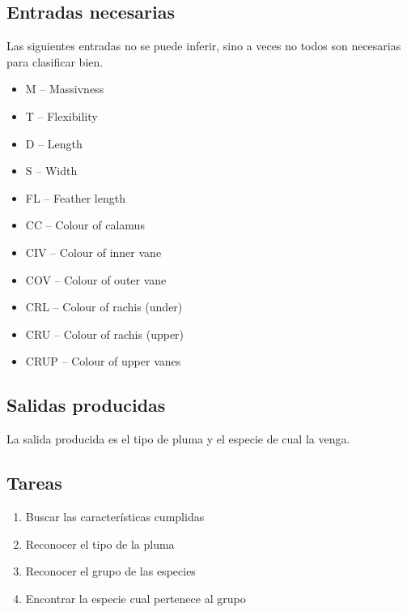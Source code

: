 \documentclass[a4paper,12pt]{article}
\begin{document}
\subsection{Entradas necesarias}
Las siguientes entradas no se puede inferir, sino a veces no todos son necesarias para clasificar bien.
\begin{itemize}
	\item M -- Massivness
	\item T -- Flexibility
	\item D -- Length
	\item S -- Width
	\item FL -- Feather length
	\item CC -- Colour of calamus
	\item CIV -- Colour of inner vane
	\item COV -- Colour of outer vane
	\item CRL -- Colour of rachis (under)
	\item CRU -- Colour of rachis (upper)
	\item CRUP -- Colour of upper vanes
\end{itemize}

\subsection{Salidas producidas}
La salida producida es el tipo de pluma y el especie de cual la venga.

\subsection{Tareas}
\begin{enumerate}
	\item Buscar las características cumplidas
	\item Reconocer el tipo de la pluma
	\item Reconocer el grupo de las especies
	\item Encontrar la especie cual pertenece al grupo
\end{enumerate}
\end{document}
